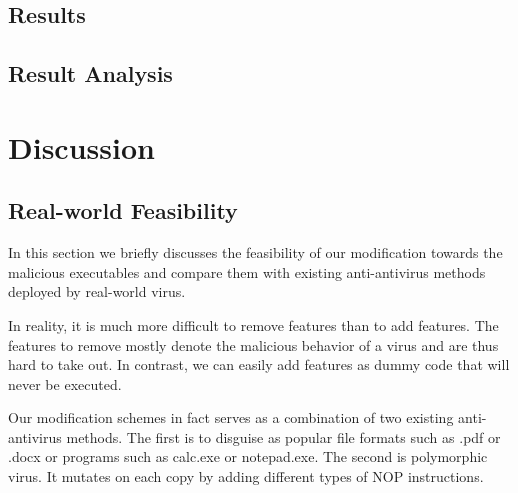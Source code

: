 \documentclass[11pt]{article}
\begin{document}



\subsection{Results}

\subsection{Result Analysis}

\section{Discussion}

\subsection{Real-world Feasibility}
In this section we briefly discusses the feasibility of our modification towards the malicious executables and compare them with existing anti-antivirus methods deployed by real-world virus.

In reality, it is much more difficult to remove features than to add features. The features to remove mostly denote the malicious behavior of a virus and are thus hard to take out. In contrast, we can easily add features as dummy code that will never be executed.

Our modification schemes in fact serves as a combination of two existing anti-antivirus methods. The first is to disguise as popular file formats such as .pdf or .docx or programs such as calc.exe or notepad.exe. The second is polymorphic virus. It mutates on each copy by adding different types of NOP instructions.
\end{document}
